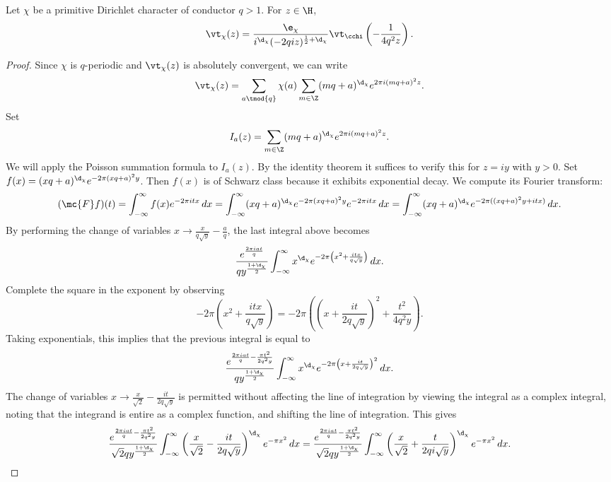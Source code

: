       \begin{theorem}\label{thm:functional_equation_Dirichlet_theta}
        Let $\chi$ be a primitive Dirichlet character of conductor $q > 1$. For $z \in \H$,
        \[
          \vt_{\chi}(z) = \frac{\e_{\chi}}{i^{\d_{\chi}}(-2qiz)^{\frac{1}{2}+\d_{\chi}}}\vt_{\cchi}\left(-\frac{1}{4q^{2}z}\right).
        \]
      \end{theorem}
      \begin{proof}
        Since $\chi$ is $q$-periodic and $\vt_{\chi}(z)$ is absolutely convergent, we can write
        \[
          \vt_{\chi}(z) = \sum_{a \tmod{q}}\chi(a)\sum_{m \in \Z}(mq+a)^{\d_{\chi}}e^{2\pi i(mq+a)^{2}z}.
        \]
        Set
        \[
          I_{a}(z) = \sum_{m \in \Z}(mq+a)^{\d_{\chi}}e^{2\pi i(mq+a)^{2}z}.
        \]
        We will apply the Poisson summation formula to $I_{a}(z)$. By the identity theorem it suffices to verify this for $z = iy$ with $y > 0$. Set $f(x) = (xq+a)^{\d_{\chi}}e^{-2\pi(xq+a)^{2}y}$. Then $f(x)$ is of Schwarz class because it exhibits exponential decay. We compute its Fourier transform:
        \[
          (\mc{F}f)(t) = \int_{-\infty}^{\infty}f(x)e^{-2\pi itx}\,dx = \int_{-\infty}^{\infty}(xq+a)^{\d_{\chi}}e^{-2\pi(xq+a)^{2}y}e^{-2\pi itx}\,dx = \int_{-\infty}^{\infty}(xq+a)^{\d_{\chi}}e^{-2\pi((xq+a)^{2}y+itx)}\,dx.
        \]
        By performing the change of variables $x \to \frac{x}{q\sqrt{y}}-\frac{a}{q}$, the last integral above becomes
        \[
          \frac{e^{\frac{2\pi iat}{q}}}{qy^{\frac{1+\d_{\chi}}{2}}}\int_{-\infty}^{\infty}x^{\d_{\chi}}e^{-2\pi\left(x^{2}+\frac{itx}{q\sqrt{y}}\right)}\,dx.
        \]
        Complete the square in the exponent by observing
        \[
          -2\pi\left(x^{2}+\frac{itx}{q\sqrt{y}}\right) = -2\pi\left(\left(x+\frac{it}{2q\sqrt{y}}\right)^{2}+\frac{t^{2}}{4q^{2}y}\right).
        \]
        Taking exponentials, this implies that the previous integral is equal to
        \[
          \frac{e^{\frac{2\pi iat}{q}-\frac{\pi t^{2}}{2q^{2}y}}}{qy^{\frac{1+\d_{\chi}}{2}}}\int_{-\infty}^{\infty}x^{\d_{\chi}}e^{-2\pi\left(x+\frac{it}{2q\sqrt{y}}\right)^{2}}\,dx.
        \]
        The change of variables $x \to \frac{x}{\sqrt{2}}-\frac{it}{2q\sqrt{y}}$ is permitted without affecting the line of integration by viewing the integral as a complex integral, noting that the integrand is entire as a complex function, and shifting the line of integration. This gives
        \[
          \frac{e^{\frac{2\pi iat}{q}-\frac{\pi t^{2}}{2q^{2}y}}}{\sqrt{2}qy^{\frac{1+\d_{\chi}}{2}}}\int_{-\infty}^{\infty}\left(\frac{x}{\sqrt{2}}-\frac{it}{2q\sqrt{y}}\right)^{\d_{\chi}}e^{-\pi x^{2}}\,dx = \frac{e^{\frac{2\pi iat}{q}-\frac{\pi t^{2}}{2q^{2}y}}}{\sqrt{2}qy^{\frac{1+\d_{\chi}}{2}}}\int_{-\infty}^{\infty}\left(\frac{x}{\sqrt{2}}+\frac{t}{2qi\sqrt{y}}\right)^{\d_{\chi}}e^{-\pi x^{2}}\,dx.
\]
\end{proof}
